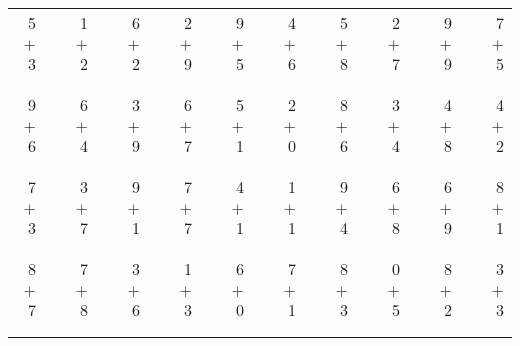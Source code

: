 \documentclass[12pt, letterpaper]{article}
\begin{document}
\begin{tabular}{rrrrrrrrrrrrrrrrrrr}
5 & & 1 & & 6 & & 2 & & 9 & & 4 & & 5 & & 2 & & 9 & & 7\\
$+$ 3 & & $+$ 2 & & $+$ 2 & & $+$ 9 & & $+$ 5 & & $+$ 6 & & $+$ 8 & & $+$ 7 & & $+$ 9 & & $+$ 5\\
\cline{1-1} \cline{3-3} \cline{5-5} \cline{7-7} \cline{9-9} \cline{11-11} \cline{13-13} \cline{15-15} \cline{17-17} \cline{19-19} \\ \\
9 & & 6 & & 3 & & 6 & & 5 & & 2 & & 8 & & 3 & & 4 & & 4\\
$+$ 6 & & $+$ 4 & & $+$ 9 & & $+$ 7 & & $+$ 1 & & $+$ 0 & & $+$ 6 & & $+$ 4 & & $+$ 8 & & $+$ 2\\
\cline{1-1} \cline{3-3} \cline{5-5} \cline{7-7} \cline{9-9} \cline{11-11} \cline{13-13} \cline{15-15} \cline{17-17} \cline{19-19} \\ \\
7 & & 3 & & 9 & & 7 & & 4 & & 1 & & 9 & & 6 & & 6 & & 8\\
$+$ 3 & & $+$ 7 & & $+$ 1 & & $+$ 7 & & $+$ 1 & & $+$ 1 & & $+$ 4 & & $+$ 8 & & $+$ 9 & & $+$ 1\\
\cline{1-1} \cline{3-3} \cline{5-5} \cline{7-7} \cline{9-9} \cline{11-11} \cline{13-13} \cline{15-15} \cline{17-17} \cline{19-19} \\ \\
8 & & 7 & & 3 & & 1 & & 6 & & 7 & & 8 & & 0 & & 8 & & 3\\
$+$ 7 & & $+$ 8 & & $+$ 6 & & $+$ 3 & & $+$ 0 & & $+$ 1 & & $+$ 3 & & $+$ 5 & & $+$ 2 & & $+$ 3\\
\cline{1-1} \cline{3-3} \cline{5-5} \cline{7-7} \cline{9-9} \cline{11-11} \cline{13-13} \cline{15-15} \cline{17-17} \cline{19-19} \\ \\
\end{tabular}
\newpage
\end{document}

